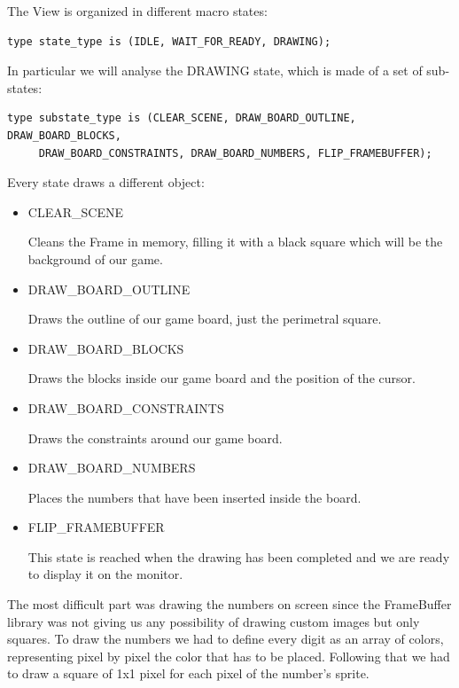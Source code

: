 \documentclass[12pt]{report}
\begin{document}
\newpage

The View is organized in different macro states:

\begin{verbatim}
type state_type is (IDLE, WAIT_FOR_READY, DRAWING);
\end{verbatim}

In particular we will analyse the DRAWING state, which is made of a set of
sub-states:

\begin{verbatim}
type substate_type is (CLEAR_SCENE, DRAW_BOARD_OUTLINE, DRAW_BOARD_BLOCKS,
     DRAW_BOARD_CONSTRAINTS, DRAW_BOARD_NUMBERS, FLIP_FRAMEBUFFER);
\end{verbatim}

Every state draws a different object:

\begin{itemize}
  \item CLEAR\_SCENE

  Cleans the Frame in memory, filling it with a black square which will be
  the background of our game.

  \item DRAW\_BOARD\_OUTLINE

  Draws the outline of our game board, just the perimetral square.

  \item DRAW\_BOARD\_BLOCKS

  Draws the blocks inside our game board and the position of the cursor.

  \item DRAW\_BOARD\_CONSTRAINTS

  Draws the constraints around our game board.

  \item DRAW\_BOARD\_NUMBERS

  Places the numbers that have been inserted inside the board.

  \item FLIP\_FRAMEBUFFER

  This state is reached when the drawing has been completed and we are
  ready to display it on the monitor.
\end{itemize}

The most difficult part was drawing the numbers on screen since the
FrameBuffer library was not giving us any possibility of drawing custom
images but only squares. To draw the numbers we had to define every digit
as an array of colors, representing pixel by pixel the color that has to
be placed. Following that we had to draw a square of 1x1 pixel for each
pixel of the number's sprite.
\end{document}
